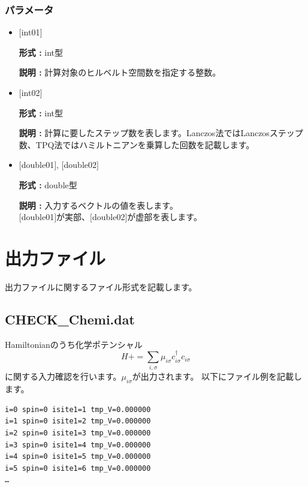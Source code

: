 \subsubsection{パラメータ}
 \begin{itemize}

  \item  $[$int01$]$

 {\bf 形式 :} int型

{\bf 説明 :} 計算対象のヒルベルト空間数を指定する整数。

  \item  $[$int02$]$

 {\bf 形式 :} int型

{\bf 説明 :} { 計算に要したステップ数を表します。Lanczos法ではLanczosステップ数、TPQ法ではハミルトニアンを乗算した回数を記載します。}
 
 \item  $[$double01$]$, $[$double02$]$

 {\bf 形式 :} double型 

{\bf 説明 :} 入力するベクトルの値を表します。\\
$[$double01$]$が実部、$[$double02$]$が虚部を表します。\\
\end{itemize}

\newpage
\section{出力ファイル}
\label{Sec:outputfile}
出力ファイルに関するファイル形式を記載します。
\subsection{CHECK\_Chemi.dat}
\label{Subsec:checkchemi}
Hamiltonianのうち化学ポテンシャル
\begin{equation}
H+=\sum_{i,\sigma} \mu_{i\sigma} c_{i\sigma}^{\dagger}c_{i\sigma}
\end{equation}
に関する入力確認を行います。$\mu_{i\sigma}$が出力されます。
以下にファイル例を記載します。

\begin{minipage}{12.5cm}
\begin{screen}
\begin{verbatim}
i=0 spin=0 isite1=1 tmp_V=0.000000 
i=1 spin=0 isite1=2 tmp_V=0.000000 
i=2 spin=0 isite1=3 tmp_V=0.000000 
i=3 spin=0 isite1=4 tmp_V=0.000000 
i=4 spin=0 isite1=5 tmp_V=0.000000 
i=5 spin=0 isite1=6 tmp_V=0.000000 
…
\end{verbatim}
\end{screen}
\end{minipage}

